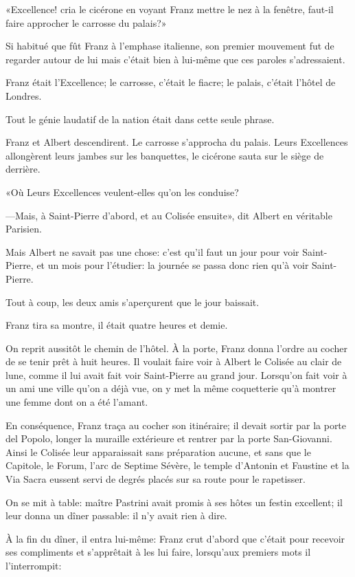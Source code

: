 «Excellence! cria le cicérone en voyant Franz mettre le nez à la fenêtre, faut-il faire approcher le carrosse du palais?» 

Si habitué que fût Franz à l'emphase italienne, son premier mouvement fut de regarder autour de lui mais c'était bien à lui-même que ces paroles s'adressaient. 

Franz était l'Excellence; le carrosse, c'était le fiacre; le palais, c'était l'hôtel de Londres. 

Tout le génie laudatif de la nation était dans cette seule phrase. 

Franz et Albert descendirent. Le carrosse s'approcha du palais. Leurs Excellences allongèrent leurs jambes sur les banquettes, le cicérone sauta sur le siège de derrière. 

«Où Leurs Excellences veulent-elles qu'on les conduise? 

—Mais, à Saint-Pierre d'abord, et au Colisée ensuite», dit Albert en véritable Parisien. 

Mais Albert ne savait pas une chose: c'est qu'il faut un jour pour voir Saint-Pierre, et un mois pour l'étudier: la journée se passa donc rien qu'à voir Saint-Pierre. 

Tout à coup, les deux amis s'aperçurent que le jour baissait. 

Franz tira sa montre, il était quatre heures et demie. 

On reprit aussitôt le chemin de l'hôtel. À la porte, Franz donna l'ordre au cocher de se tenir prêt à huit heures. Il voulait faire voir à Albert le Colisée au clair de lune, comme il lui avait fait voir Saint-Pierre au grand jour. Lorsqu'on fait voir à un ami une ville qu'on a déjà vue, on y met la même coquetterie qu'à montrer une femme dont on a été l'amant. 

En conséquence, Franz traça au cocher son itinéraire; il devait sortir par la porte del Popolo, longer la muraille extérieure et rentrer par la porte San-Giovanni. Ainsi le Colisée leur apparaissait sans préparation aucune, et sans que le Capitole, le Forum, l'arc de Septime Sévère, le temple d'Antonin et Faustine et la Via Sacra eussent servi de degrés placés sur sa route pour le rapetisser. 

On se mit à table: maître Pastrini avait promis à ses hôtes un festin excellent; il leur donna un dîner passable: il n'y avait rien à dire. 

À la fin du dîner, il entra lui-même: Franz crut d'abord que c'était pour recevoir ses compliments et s'apprêtait à les lui faire, lorsqu'aux premiers mots il l'interrompit: 

